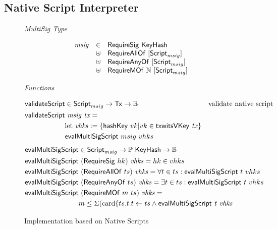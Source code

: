 \documentclass[11pt,a4paper,dvipsnames,twosided]{article}
\newcommand{\N}{\ensuremath{\mathbb{N}}}
\newcommand{\Bool}{\ensuremath{\mathbb{B}}}
\newcommand{\Tx}{\type{Tx}}
\newcommand{\Script}{\type{Script}}
\newcommand{\ScriptMSig}{\Script_{msig}}
\newcommand{\KeyHash}{\type{KeyHash}}
\theoremstyle{definition}
\newcommand{\leteq}{\ensuremath{\mathrel{\mathop:}=}}
\begin{document}
\subsection{Native Script Interpreter}
\label{sec:native-script-interp}

\begin{figure}[hbt]
  \emph{MultiSig Type}

  \begin{equation*}
    \begin{array}{rll}
      \var{msig} & \in & \type{RequireSig}~\KeyHash\\
      & \uniondistinct &
         \type{RequireAllOf}~[\ScriptMSig] \\
      & \uniondistinct&
         \type{RequireAnyOf}~[\ScriptMSig] \\
      & \uniondistinct&
        \type{RequireMOf}~\N~[\ScriptMSig]
    \end{array}
  \end{equation*}

  \emph{Functions}

  \begin{align*}
    \fun{validateScript} & \in\ScriptMSig\to\Tx\to\Bool & \text{validate native
                                                          script} \\
    \fun{validateScript} & ~\var{msig}~\var{tx}= \\
                         & \textrm{let}~\var{vhks}\leteq \{\fun{hashKey}~vk \vert
                           vk \in \fun{txwitsVKey}~\var{tx}\} \\
                         & \fun{evalMultiSigScript}~msig~vhks\\
  \end{align*}
  \begin{align*}
    \fun{evalMultiSigScript} & \in\ScriptMSig\to\powerset\KeyHash\to\Bool & \\
    \fun{evalMultiSigScript} & ~(\type{RequireSig}~hk)~\var{vhks} =  hk \in vhks \\
    \fun{evalMultiSigScript} & ~(\type{RequireAllOf}~ts)~\var{vhks} =
                              \forall t \in ts: \fun{evalMultiSigScript}~t~vhks\\
    \fun{evalMultiSigScript} & ~(\type{RequireAnyOf}~ts)~\var{vhks} =
                              \exists t \in ts: \fun{evalMultiSigScript}~t~vhks\\
    \fun{evalMultiSigScript} & ~(\type{RequireMOf}~m~ts)~\var{vhks} = \\
                             & m \leq \Sigma
                               (\textrm{card} \{ t s.t. t \leftarrow ts \wedge \fun{evalMultiSigScript}~\var{t}~\var{vhks}
  \end{align*}

  \caption{Implementation based on Native Scripts}
  \label{fig:types-msig}
\end{figure}
\end{document}
